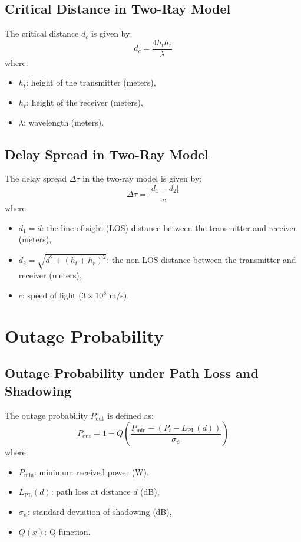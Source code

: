 \documentclass[a4paper,12pt]{book}
\begin{document}
	\subsection{Critical Distance in Two-Ray Model}
	The critical distance \( d_c \) is given by:
	\[
	d_c = \frac{4 h_t h_r}{\lambda}
	\]
	where:
	\begin{itemize}
		\item \( h_t \): height of the transmitter (meters),
		\item \( h_r \): height of the receiver (meters),
		\item \( \lambda \): wavelength (meters).
	\end{itemize}
	
	\subsection{Delay Spread in Two-Ray Model}
	The delay spread \( \Delta \tau \) in the two-ray model is given by:
	\[
	\Delta \tau = \frac{|d_1 - d_2|}{c}
	\]
	where:
	\begin{itemize}
		\item \( d_1 = d \): the line-of-sight (LOS) distance between the transmitter and receiver (meters),
		\item \( d_2 = \sqrt{d^2 + (h_t + h_r)^2} \): the non-LOS distance between the transmitter and receiver (meters),
		\item \( c \): speed of light (\(3 \times 10^8\) m/s).
	\end{itemize}
	
	\section{Outage Probability}
	
	\subsection{Outage Probability under Path Loss and Shadowing}
	The outage probability \( P_{\text{out}} \) is defined as:
	\[
	P_{\text{out}} = 1 - Q \left( \frac{P_{\min} - (P_t - L_{\text{PL}}(d))}{\sigma_{\psi}} \right)
	\]
	where:
	\begin{itemize}
		\item \( P_{\min} \): minimum received power (W),
		\item \( L_{\text{PL}}(d) \): path loss at distance \( d \) (dB),
		\item \( \sigma_{\psi} \): standard deviation of shadowing (dB),
		\item \( Q(x) \): Q-function.
	\end{itemize}
	
\end{document}
